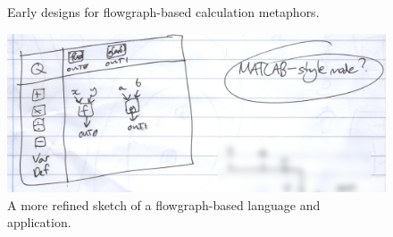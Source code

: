 \documentclass[12pt,twoside,notitlepage,xetex]{report}
\begin{document}
\begin{center}
\begin{figure}[H]
\begin{center}
\end{center}
\caption{Early designs for flowgraph-based calculation metaphors.}
\end{figure}
\end{center}

\begin{center}
\begin{figure}[H]
\begin{center}
\includegraphics[width=\textwidth]{figs/mockups/sketches/11/11jii.jpg}
\end{center}
\caption{A more refined sketch of a flowgraph-based language and application.}
\end{figure}
\end{center}
\end{document}
